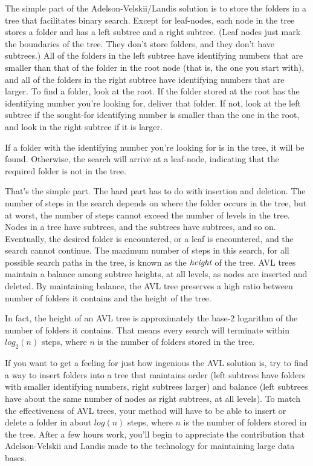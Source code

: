 The simple part of the Adelson-Velskii/Landis solution is to store
the folders in a tree that facilitates binary search. Except for
leaf-nodes, each node in the tree stores a folder and has a left
subtree and a right subtree. (Leaf nodes just mark the boundaries of
the tree. They don't store folders, and they don't have subtrees.)
All of the folders in the left subtree have identifying numbers that
are smaller than that of the folder in the root node (that is,
the one you start with), and all of
the folders in the right subtree have identifying numbers that are larger.
To find a folder, look at the root. If the folder stored at
the root has the identifying number you're looking for, deliver that folder.
If not, look at the left subtree if the sought-for identifying number
is smaller than the one in the root, and look in the right subtree
if it is larger.

If a folder with the identifying number you're looking for is in the tree,
it will be found.
Otherwise, the search will arrive at a leaf-node,
indicating that the required folder is not in the tree.

That's the simple part. The hard part has to do with insertion and
deletion. The number of steps in the search depends on where the
folder occurs in the tree, but at worst, the number of steps cannot
exceed the number of levels in the tree. Nodes in a tree have
subtrees, and the subtrees have subtrees, and so on.
Eventually, the desired folder is encountered, or a leaf is
encountered, and the search cannot continue. The maximum number of
steps in this search, for all possible search paths in the tree, is
known as the $\emph{height}$ of the tree.
AVL trees maintain a balance among subtree heights, at all levels,
as nodes are inserted and deleted.
By maintaining balance, the AVL tree
preserves a high ratio between number of folders it contains and the
height of the tree.

In fact, the height of an AVL tree is approximately the base-2
logarithm of the number of folders it contains. That means every
search will terminate within $log_2(n)$ steps, where $n$ is the
number of folders stored in the tree.

If you want to get a feeling for just how ingenious the AVL
solution is, try to find a way to insert folders into a
tree that maintains order (left subtrees have folders with smaller
identifying numbers, right subtrees larger) and balance (left
subtrees have about the same number of nodes as right subtrees, at
all levels). To match the effectiveness of AVL trees, your method
will have to be able to insert or delete a folder in about
$log(n)$ steps, where $n$ is the number of folders stored
in the tree.
After a few hours work, you'll begin to appreciate
the contribution that Adelson-Velskii and Landis made to the technology for
maintaining large data bases.

